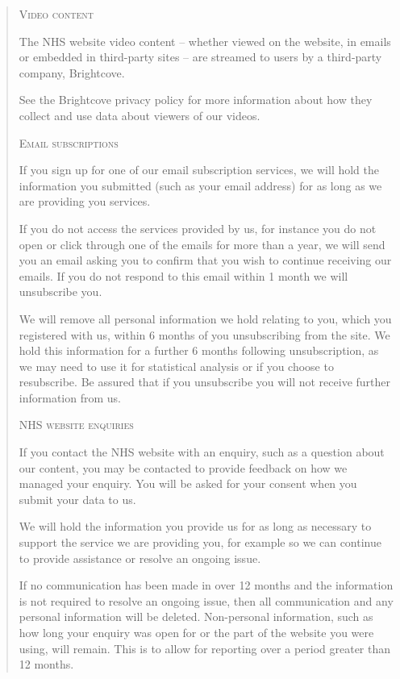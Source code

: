 \documentclass[twocolumn, letterpaper,13pt]{scrartcl}
\begin{document}
\begin{quote}
        \textsc{Video content}
        
        The NHS website video content – whether viewed on the website, in emails or embedded in third-party sites – are streamed to users by a third-party company, Brightcove.
        
        See the Brightcove privacy policy for more information about how they collect and use data about viewers of our videos.
        
        \textsc{Email subscriptions}
        
        If you sign up for one of our email subscription services, we will hold the information you submitted (such as your email address) for as long as we are providing you services.
        
        If you do not access the services provided by us, for instance you do not open or click through one of the emails for more than a year, we will send you an email asking you to confirm that you wish to continue receiving our emails. If you do not respond to this email within 1 month we will unsubscribe you.
        
        We will remove all personal information we hold relating to you, which you registered with us, within 6 months of you unsubscribing from the site. We hold this information for a further 6 months following unsubscription, as we may need to use it for statistical analysis or if you choose to resubscribe. Be assured that if you unsubscribe you will not receive further information from us.
        
        \textsc{NHS website enquiries}
        
        If you contact the NHS website with an enquiry, such as a question about our content, you may be contacted to provide feedback on how we managed your enquiry. You will be asked for your consent when you submit your data to us.
        
        We will hold the information you provide us for as long as necessary to support the service we are providing you, for example so we can continue to provide assistance or resolve an ongoing issue.
        
        If no communication has been made in over 12 months and the information is not required to resolve an ongoing issue, then all communication and any personal information will be deleted. Non-personal information, such as how long your enquiry was open for or the part of the website you were using, will remain. This is to allow for reporting over a period greater than 12 months.
        

\end{quote}
\end{document}
